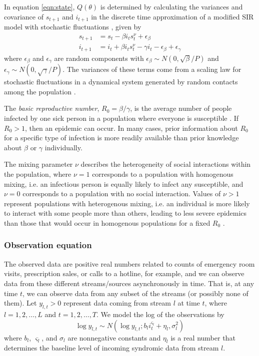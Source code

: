 \documentclass{elsarticle}
\begin{document}
In equation \eqref{eqn:state}, $Q(\theta)$ is determined by calculating the variances and covariance of $s_{t+1}$ and $i_{t+1}$ in the discrete time approximation of a modified SIR model with stochastic fluctuations \citep{herwaarden1995stochepid, dangerfield2009stochepid, anderson2004sars}, given by
\begin{align*}
s_{t+1} &= s_t - \beta i_ts^\nu_t + \epsilon_\beta \\
i_{t+1} &= i_t + \beta i_ts^\nu_t - \gamma i_t - \epsilon_\beta + \epsilon_\gamma
\end{align*}
where $\epsilon_\beta$ and $\epsilon_\gamma$ are random components with $\epsilon_\beta \sim N(0, \sqrt{\beta} / P)$ and $\epsilon_\gamma \sim N(0, \sqrt{\gamma} / P)$. The variances of these terms come from a scaling law for stochastic fluctuations in a dynamical system generated by random contacts among the population \citep{ovaskainen2010extinction, herwaarden1995stochepid, dangerfield2009stochepid, skvortsov2012monitoring}.

The \emph{basic reproductive number}, $R_0 = \beta / \gamma$, is the average number of people infected by one sick person in a population where everyone is susceptible \citep{heff2005repratio}. If $R_0 > 1$, then an epidemic can occur. In many cases, prior information about $R_0$ for a specific type of infection is more readily available than prior knowledge about $\beta$ or $\gamma$ individually.

The mixing parameter $\nu$ describes the heterogeneity of social interactions within the population, where $\nu = 1$ corresponds to a population with homogenous mixing, i.e. an infectious person is equally likely to infect any susceptible, and $\nu = 0$ corresponds to a population with no social interaction. Values of $\nu > 1$ represent populations with heterogenous mixing, i.e. an individual is more likely to interact with some people more than others, leading to less severe epidemics than those that would occur in homogenous populations for a fixed $R_0$ \citep{stroud2006powerlaw, novozhilov2008hetero}.

\subsubsection{Observation equation \label{sec:obs}}

The observed data are positive real numbers related to counts of emergency room visits, prescription sales, or calls to a hotline, for example, and we can observe data from these different streams/sources asynchronously in time. That is, at any time $t$, we can observe data from any subset of the streams (or possibly none of them). Let $y_{l,t}>0$ represent data coming from stream $l$ at time $t$, where $l = 1,2,\ldots,L$ and $t = 1,2,\ldots,T$. We model the log of the observations by
\begin{equation}
\log y_{l,t} \sim N\left(\log y_{l,t};b_li_t^{\varsigma_l} + \eta_l,\sigma_l^2\right) \label{eqn:obs}
\end{equation}
where $b_l$, $\varsigma_l$, and $\sigma_l$ are nonnegative constants \citep{skvortsov2012monitoring} and $\eta_l$ is a real number that determines the baseline level of incoming syndromic data from stream $l$.
\end{document}
